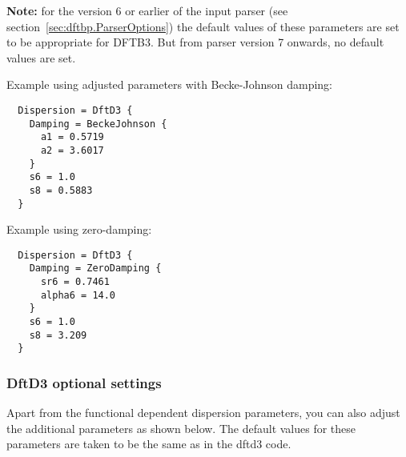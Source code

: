 \textbf{Note:} for the version 6 or earlier of the \dftbp{} input parser (see
section~\ref{sec:dftbp.ParserOptions}) the default values of these parameters
are set to be appropriate for DFTB3. But from parser version 7 onwards, no
default values are set.

Example using adjusted parameters with Becke-Johnson damping:
\begin{verbatim}
  Dispersion = DftD3 {
    Damping = BeckeJohnson {
      a1 = 0.5719
      a2 = 3.6017
    }
    s6 = 1.0
    s8 = 0.5883
  }
\end{verbatim}

Example using zero-damping:
\begin{verbatim}
  Dispersion = DftD3 {
    Damping = ZeroDamping {
      sr6 = 0.7461
      alpha6 = 14.0
    }
    s6 = 1.0
    s8 = 3.209
  }
\end{verbatim}

\subsubsection{DftD3 optional settings}
Apart from the functional dependent dispersion parameters, you can also adjust
the additional parameters as shown below. The default values for these
parameters are taken to be the same as in the dftd3 code.

